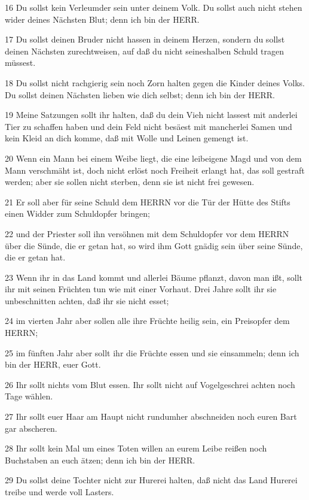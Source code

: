 \par 16 Du sollst kein Verleumder sein unter deinem Volk. Du sollst auch nicht stehen wider deines Nächsten Blut; denn ich bin der HERR.
\par 17 Du sollst deinen Bruder nicht hassen in deinem Herzen, sondern du sollst deinen Nächsten zurechtweisen, auf daß du nicht seineshalben Schuld tragen müssest.
\par 18 Du sollst nicht rachgierig sein noch Zorn halten gegen die Kinder deines Volks. Du sollst deinen Nächsten lieben wie dich selbst; denn ich bin der HERR.
\par 19 Meine Satzungen sollt ihr halten, daß du dein Vieh nicht lassest mit anderlei Tier zu schaffen haben und dein Feld nicht besäest mit mancherlei Samen und kein Kleid an dich komme, daß mit Wolle und Leinen gemengt ist.
\par 20 Wenn ein Mann bei einem Weibe liegt, die eine leibeigene Magd und von dem Mann verschmäht ist, doch nicht erlöst noch Freiheit erlangt hat, das soll gestraft werden; aber sie sollen nicht sterben, denn sie ist nicht frei gewesen.
\par 21 Er soll aber für seine Schuld dem HERRN vor die Tür der Hütte des Stifts einen Widder zum Schuldopfer bringen;
\par 22 und der Priester soll ihn versöhnen mit dem Schuldopfer vor dem HERRN über die Sünde, die er getan hat, so wird ihm Gott gnädig sein über seine Sünde, die er getan hat.
\par 23 Wenn ihr in das Land kommt und allerlei Bäume pflanzt, davon man ißt, sollt ihr mit seinen Früchten tun wie mit einer Vorhaut. Drei Jahre sollt ihr sie unbeschnitten achten, daß ihr sie nicht esset;
\par 24 im vierten Jahr aber sollen alle ihre Früchte heilig sein, ein Preisopfer dem HERRN;
\par 25 im fünften Jahr aber sollt ihr die Früchte essen und sie einsammeln; denn ich bin der HERR, euer Gott.
\par 26 Ihr sollt nichts vom Blut essen. Ihr sollt nicht auf Vogelgeschrei achten noch Tage wählen.
\par 27 Ihr sollt euer Haar am Haupt nicht rundumher abschneiden noch euren Bart gar abscheren.
\par 28 Ihr sollt kein Mal um eines Toten willen an eurem Leibe reißen noch Buchstaben an euch ätzen; denn ich bin der HERR.
\par 29 Du sollst deine Tochter nicht zur Hurerei halten, daß nicht das Land Hurerei treibe und werde voll Lasters.
